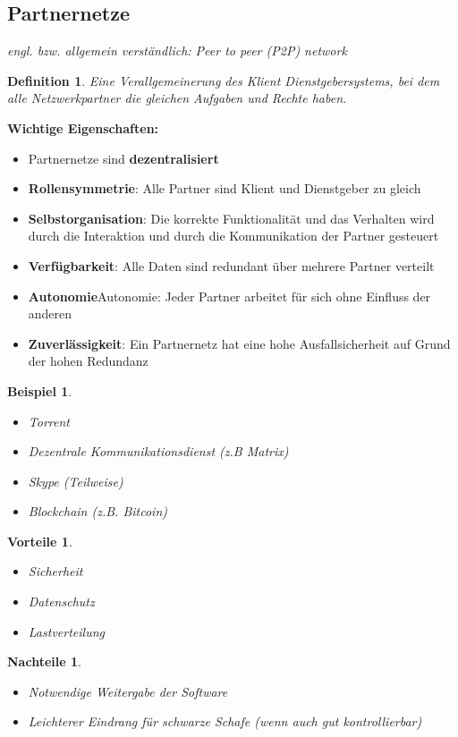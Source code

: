 \documentclass[a4paper]{article}
\theoremstyle{break}
\newtheorem{defi}{Definition}[section]
\newtheorem{ex}{Beispiel}[section]
\newtheorem{why}{Vorteile}[section]
\newtheorem{whynot}{Nachteile}[section]
\begin{document}
\subsection{Partnernetze}
\textit{engl. bzw. allgemein verständlich: Peer to peer (P2P) network}
\begin{defi}
	Eine Verallgemeinerung des Klient Dienstgebersystems, bei dem alle Netzwerkpartner die gleichen Aufgaben und Rechte haben.
\end{defi}
\textbf{Wichtige Eigenschaften:}
\begin{itemize}
	\item Partnernetze sind \textbf{dezentralisiert}
	\item \textbf{Rollensymmetrie}: Alle Partner sind Klient und Dienstgeber zu gleich
	\item \textbf{Selbstorganisation}: Die korrekte Funktionalität und das Verhalten wird durch die Interaktion und durch die Kommunikation der Partner gesteuert
	\item \textbf{Verfügbarkeit}: Alle Daten sind redundant über mehrere Partner verteilt
	\item \textbf{Autonomie}Autonomie: Jeder Partner arbeitet für sich ohne Einfluss der anderen
	\item \textbf{Zuverlässigkeit}: Ein Partnernetz hat eine hohe Ausfallsicherheit auf Grund der hohen Redundanz
\end{itemize}
\begin{ex}
	\begin{itemize}
		\item Torrent
		\item Dezentrale Kommunikationsdienst (z.B Matrix)
		\item Skype (Teilweise)
		\item Blockchain (z.B. Bitcoin)
	\end{itemize}
\end{ex}
\begin{why}
	\begin{itemize}
		\item Sicherheit
		\item Datenschutz
		\item Lastverteilung
	\end{itemize}
\end{why}
\begin{whynot}
	\begin{itemize}
		\item Notwendige Weitergabe der Software
		\item Leichterer Eindrang für schwarze Schafe (wenn auch gut kontrollierbar)
	\end{itemize}
\end{whynot}
\end{document}
